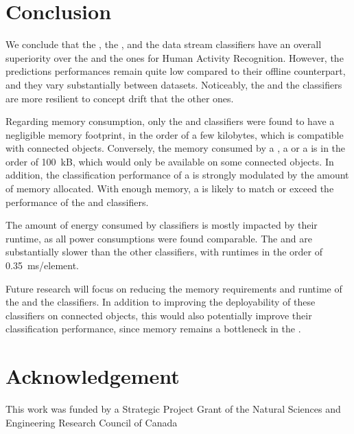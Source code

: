 \section{Conclusion}

We conclude that the \hoeffdingtree, the \mondrianforest, and the
\naivebayes data stream classifiers have an overall superiority over the
\FNN and the \mcnns ones for Human Activity Recognition.  However, the
predictions performances remain quite low compared to their offline
counterpart, and they vary substantially between datasets. Noticeably, the
\hoeffdingtree and the \mcnns classifiers are more resilient to concept drift that the
other ones.

Regarding memory consumption, only the \mcnns and \naivebayes classifiers
were found to have a negligible memory footprint, in the order of a few
kilobytes, which is compatible with connected objects. Conversely, the
memory consumed by a \mondrianforest, a \FNN or a \hoeffdingtree is in the
order of 100~kB, which would only be available on some connected objects.
In addition, the classification performance of a \mondrianforest is
strongly modulated by the amount of memory allocated. With enough memory, a
\mondrianforest is likely to match or exceed the performance of the
\hoeffdingtree and \naivebayes classifiers.

The amount of energy consumed by classifiers is mostly impacted by their
runtime, as all power consumptions were found comparable. The
\hoeffdingtree and \mondrianforest are substantially slower than the other
classifiers, with runtimes in the order of 0.35~ms/element. 

Future research will focus on reducing the memory requirements and runtime
of the \hoeffdingtree and the \mondrianforest classifiers. In addition to
improving the deployability of these classifiers on connected objects, this
would also potentially improve their classification performance, since
memory remains a bottleneck in the \mondrianforest.

\section*{Acknowledgement}
This work was funded by a Strategic Project Grant of
the Natural Sciences and Engineering Research Council of
Canada

